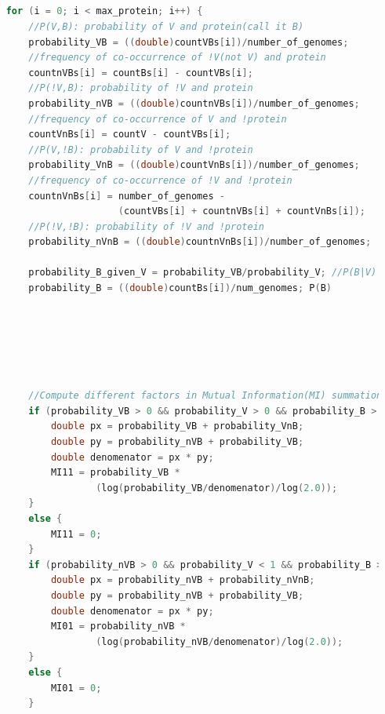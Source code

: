 \documentclass{ucetd}
\begin{document}
\begin{appendices}
\chapter{}

\begin{lstlisting}[language=C]
    for (i = 0; i < max_protein; i++) {
		//P(V,B): probability of V and protein(call it B)
        probability_VB = ((double)countVBs[i])/number_of_genomes;
        //frequency of co-occurrence of !V(not V) and protein
        countnVBs[i] = countBs[i] - countVBs[i];
        //P(!V,B): probability of !V and protein
        probability_nVB = ((double)countnVBs[i])/number_of_genomes;
        //frequency of co-occurrence of V and !protein
        countVnBs[i] = countV - countVBs[i];
        //P(V,!B): probability of V and !protein
        probability_VnB = ((double)countVnBs[i])/number_of_genomes;
        //frequency of co-occurrence of !V and !protein
        countnVnBs[i] = number_of_genomes - 
        				(countVBs[i] + countnVBs[i] + countVnBs[i]);
        //P(!V,!B): probability of !V and !protein
        probability_nVnB = ((double)countnVnBs[i])/number_of_genomes;

        probability_B_given_V = probability_VB/probability_V; //P(B|V)
        probability_B = ((double)countBs[i])/num_genomes; P(B)
        
        
        
        
        
        
        //Compute different factors in Mutual Information(MI) summation
        if (probability_VB > 0 && probability_V > 0 && probability_B > 0) {
            double px = probability_VB + probability_VnB;
            double py = probability_nVB + probability_VB;
            double denomenator = px * py;
            MI11 = probability_VB * 
            		(log(probability_VB/denomenator)/log(2.0));
        }
        else {
            MI11 = 0;
        }
        if (probability_nVB > 0 && probability_V < 1 && probability_B > 0) {
            double px = probability_nVB + probability_nVnB;
            double py = probability_nVB + probability_VB;
            double denomenator = px * py;
            MI01 = probability_nVB * 
            		(log(probability_nVB/denomenator)/log(2.0));
        }
        else {
            MI01 = 0;
        }
        
        
        
        
        
        
        

\end{lstlisting}
\end{appendices}
\end{document}
